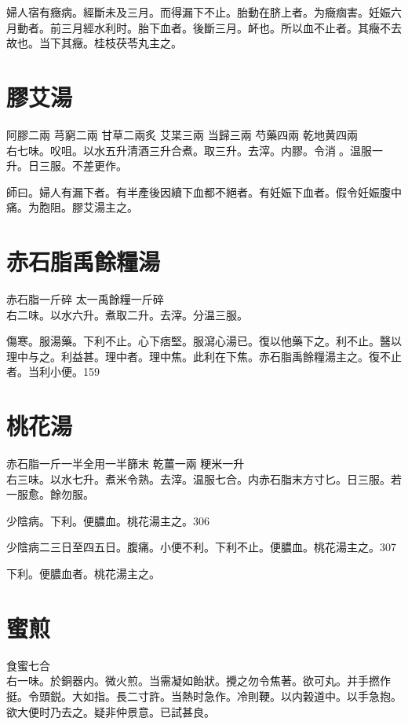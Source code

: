 婦人宿有癥病。經斷未及三月。而得漏下不止。胎動在脐上者。为癥痼害。妊娠六月動者。前三月經水利时。胎下血者。後斷三月。衃也。所以血不止者。其癥不去故也。当下其癥。桂枝茯苓丸主之。{\dengben}

\section{膠艾湯}

阿膠{\scriptsize 二兩} 芎窮{\scriptsize 二兩} 甘草{\scriptsize 二兩炙} 艾枼{\scriptsize 三兩} 当歸{\scriptsize 三兩} 芍藥{\scriptsize 四兩} 乾地黄{\scriptsize 四兩}\\
右七味。㕮咀。以水五升清酒三升合煮。取三升。去滓。内膠。令消{\sungtpii 𥁞}。温服一升。日三服。不差更作。

師曰。婦人有漏下者。有半產後因續下血都不絕者。有妊娠下血者。假令妊娠腹中痛。为胞阻。膠艾湯主之。

\section{赤石脂禹餘糧湯}

赤石脂{\scriptsize 一斤碎} 太一禹餘糧{\scriptsize 一斤碎}\\
右二味。以水六升。煮取二升。去滓。分温三服。

傷寒。服湯藥。下利不止。心下痞堅。服瀉心湯已。復以他藥下之。利不止。醫以理中与之。利益甚。理中者。理中焦。此利在下焦。赤石脂禹餘糧湯主之。復不止者。当利小便。159

\section{桃花湯}

赤石脂{\scriptsize 一斤一半全用一半篩末} 乾薑{\scriptsize 一兩} 粳米{\scriptsize 一升}\\
右三味。以水七升。煮米令熟。去滓。温服七合。内赤石脂末方寸匕。日三服。若一服愈。餘勿服。

少陰病。下利。便膿血。桃花湯主之。306

少陰病二三日至四五日。腹痛。小便不利。下利不止。便膿血。桃花湯主之。307

下利。便膿血者。桃花湯主之。

\section{蜜煎}

食蜜{\scriptsize 七合}\\
右一味。於銅器内。微火煎。当需凝如飴狀。攪之勿令焦著。欲可丸。并手撚作挺。令頭鋭。大如指。長二寸許。当熱时急作。冷則鞕。以内榖道中。以手急抱。欲大便时乃去之。疑非仲景意。已試甚良。

